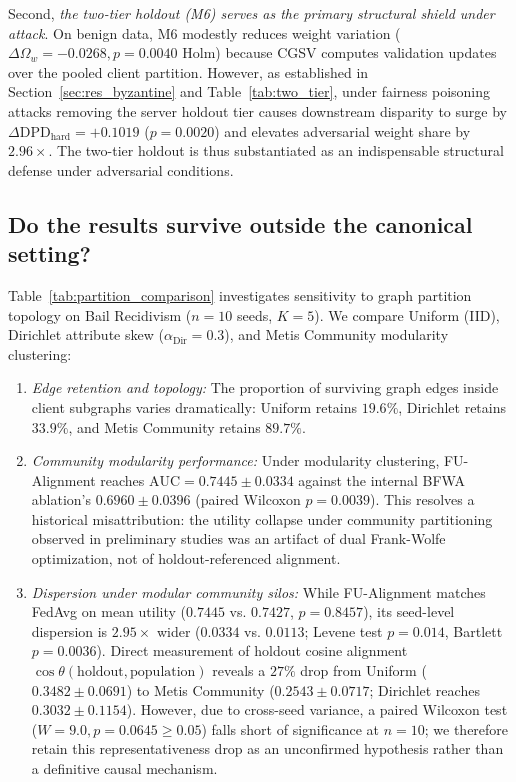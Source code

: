 \documentclass[preprint,12pt]{elsarticle}
\theoremstyle{plain}
\theoremstyle{definition}
\theoremstyle{remark}
\begin{document}
Second, \emph{the two-tier holdout (M6) serves as the primary structural shield under attack}. On benign data, M6 modestly reduces weight variation ($\Delta\Omega_w = -0.0268, p = 0.0040$ Holm) because CGSV computes validation updates over the pooled client partition. However, as established in Section~\ref{sec:res_byzantine} and Table~\ref{tab:two_tier}, under fairness poisoning attacks removing the server holdout tier causes downstream disparity to surge by $\Delta\mathrm{DPD}_{\mathrm{hard}} = +0.1019$ ($p = 0.0020$) and elevates adversarial weight share by $2.96\times$. The two-tier holdout is thus substantiated as an indispensable structural defense under adversarial conditions.

\subsection{Do the results survive outside the canonical setting?}
\label{sec:res_sensitivity}






Table~\ref{tab:partition_comparison} investigates sensitivity to graph partition topology on Bail Recidivism ($n=10$ seeds, $K=5$). We compare Uniform (IID), Dirichlet attribute skew ($\alpha_{\mathrm{Dir}}=0.3$), and Metis Community modularity clustering:
\begin{enumerate}
\item \emph{Edge retention and topology:} The proportion of surviving graph edges inside client subgraphs varies dramatically: Uniform retains $19.6\%$, Dirichlet retains $33.9\%$, and Metis Community retains $89.7\%$.
\item \emph{Community modularity performance:} Under modularity clustering, FU-Alignment reaches $\mathrm{AUC} = 0.7445 \pm 0.0334$ against the internal BFWA ablation's $0.6960 \pm 0.0396$ (paired Wilcoxon $p = 0.0039$). This resolves a historical misattribution: the utility collapse under community partitioning observed in preliminary studies was an artifact of dual Frank-Wolfe optimization, not of holdout-referenced alignment.
\item \emph{Dispersion under modular community silos:} While FU-Alignment matches FedAvg on mean utility ($0.7445$ vs. $0.7427$, $p = 0.8457$), its seed-level dispersion is $\mathbf{2.95\times}$ wider ($0.0334$ vs. $0.0113$; Levene test $p = 0.014$, Bartlett $p = 0.0036$). Direct measurement of holdout cosine alignment $\cos\theta(\text{holdout}, \text{population})$ reveals a $27\%$ drop from Uniform ($0.3482 \pm 0.0691$) to Metis Community ($0.2543 \pm 0.0717$; Dirichlet reaches $0.3032 \pm 0.1154$). However, due to cross-seed variance, a paired Wilcoxon test ($W = 9.0, p = 0.0645 \ge 0.05$) falls short of significance at $n=10$; we therefore retain this representativeness drop as an unconfirmed hypothesis rather than a definitive causal mechanism.
\end{enumerate}
\end{document}
